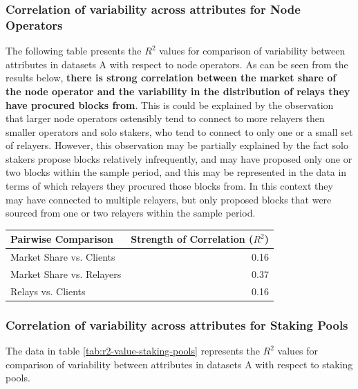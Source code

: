 \documentclass[conference]{IEEEtran}
\begin{document}
\subsubsection{Correlation of variability across attributes for Node Operators}

The following table presents the $R^2$ values for comparison of variability between attributes in datasets A with respect to node operators. As can be seen from the results below, \textbf{there is strong correlation between the market share of the node operator and the variability in the distribution of relays they have procured blocks from}. This is could be explained by the observation that larger node operators ostensibly tend to connect to more relayers then smaller operators and solo stakers, who tend to connect to only one or a small set of relayers.  However, this observation may be partially explained by the fact solo stakers propose blocks relatively infrequently, and may have proposed only one or two blocks within the sample period, and this may be represented in the data in terms of which relayers they procured those blocks from.  In this context they may have connected to multiple relayers, but only proposed blocks that were sourced from one or two relayers within the sample period.

\begin{table}[htbp]
    \centering
    \normalsize
    \begin{tabular}{p{3.9cm}r}
        \toprule
        Pairwise Comparison & Strength of Correlation ($R^2$) \\
        \midrule
        Market Share vs. Clients & 0.16 \\
        Market Share vs. Relayers & 0.37 \\
        Relays vs. Clients & 0.16 \\
        \bottomrule
    \end{tabular}
\end{table}

\subsubsection{Correlation of variability across attributes for Staking Pools}

The data in table \ref{tab:r2-value-staking-pools} represents the $R^2$ values for comparison of variability between attributes in datasets A with respect to staking pools.
\end{document}
